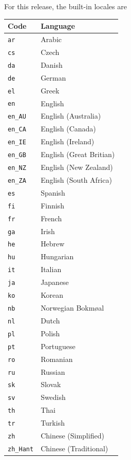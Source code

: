 For this release, the built-in locales are
\begin{center}
\begin{tabular}{|l|l|}\hline
Code & Language\\\hline
\texttt{ar} & Arabic\\
\texttt{cs} & Czech\\
\texttt{da} & Danish\\
\texttt{de} & German\\
\texttt{el} & Greek\\
\texttt{en} & English\\
\texttt{en\_AU} & English (Australia)\\
\texttt{en\_CA} & English (Canada)\\
\texttt{en\_IE} & English (Ireland)\\
\texttt{en\_GB} & English (Great Britian)\\
\texttt{en\_NZ} & English (New Zealand)\\
\texttt{en\_ZA} & English (South Africa)\\
\texttt{es} & Spanish\\
\texttt{fi} & Finnish\\
\texttt{fr} & French\\
\texttt{ga} & Irish\\
\texttt{he} & Hebrew\\
\texttt{hu} & Hungarian\\
\texttt{it} & Italian\\
\texttt{ja} & Japanese\\
\texttt{ko} & Korean\\
\texttt{nb} & Norwegian Bokm\o{a}l\\
\texttt{nl} & Dutch\\
\texttt{pl} & Polish\\
\texttt{pt} & Portuguese\\
\texttt{ro} & Romanian\\
\texttt{ru} & Russian\\
\texttt{sk} & Slovak\\
\texttt{sv} & Swedish\\
\texttt{th} & Thai\\
\texttt{tr} & Turkish\\
\texttt{zh} & Chinese (Simplified)\\
\texttt{zh\_Hant} & Chinese (Traditional)\\\hline
\end{tabular}
\end{center}

